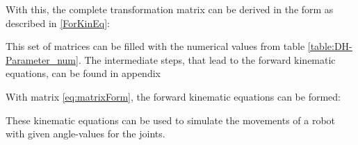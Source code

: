 With this, the complete transformation matrix can be derived in the form as described in \ref{ForKinEq}:



This set of matrices can be filled with the numerical values from table \ref{table:DH-Parameter_num}. The intermediate steps, that lead to the forward kinematic equations, can be found in appendix 


With matrix \ref{eq:matrixForm}, the forward kinematic equations can be formed:




These kinematic equations can be used to simulate the movements of a robot with given angle-values for the joints. 



